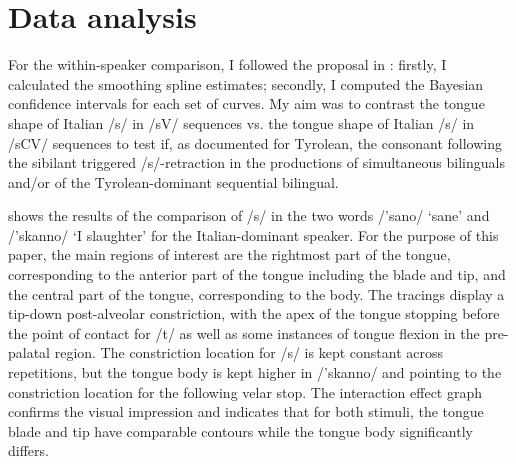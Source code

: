 \documentclass[output=paper]{LSP/langsci}
\begin{document}
\section{Data analysis}
For the within-speaker comparison, I followed the proposal in \citet{davidson_comparing_2006}: firstly, I calculated the smoothing spline estimates; secondly, I computed the Bayesian confidence intervals for each set of curves. My aim was to contrast the tongue shape of Italian /s/ in /sV/ sequences vs. the tongue shape of Italian /s/ in /sCV/ sequences to test if, as documented for Tyrolean, the consonant following the sibilant triggered /s/-retraction in the productions of simultaneous bilinguals and/or of the Tyrolean-dominant sequential bilingual.

 shows the results of the comparison of /s/ in the two words /'sano/ `sane' and /'skanno/ `I slaughter' for the Italian-dominant speaker. For the purpose of this paper, the main regions of interest are the rightmost part of the tongue, corresponding to the anterior part of the tongue including the blade and tip, and the central part of the tongue, corresponding to the body. The tracings display a tip-down post-alveolar constriction, with the apex of the tongue stopping before the point of contact for /t/ as well as some instances of tongue flexion in the pre-palatal region. The constriction location for /s/ is kept constant across repetitions, but the tongue body is kept higher in /'skanno/ and pointing to the constriction location for the following velar stop. The interaction effect graph confirms the visual impression and indicates that for both stimuli, the tongue blade and tip have comparable contours while the tongue body significantly differs.
\end{document}
